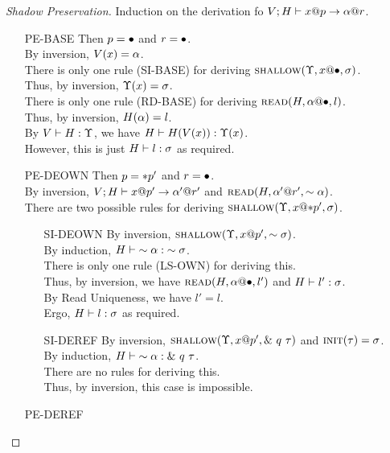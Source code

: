 \begin{proof}[Shadow Preservation]
  Induction on the derivation fo ${V;H} \vdash {{x}@{p}} \to {{\alpha}@{r}}$.
  \begin{itemize}
    \item[\textsc{PE-BASE}] 
      Then $p = \bullet$ and $r = \bullet$.\\
      By inversion, $V(x)=\alpha$.\\
      There is only one rule (\textsc{SI-BASE}) for deriving $\textsc{shallow}({\Upsilon},{{x}@{\bullet}},{\sigma})$.\\
      Thus, by inversion, $\Upsilon(x)=\sigma$.\\
      There is only one rule (\textsc{RD-BASE}) for deriving $\textsc{read}({H},{{\alpha}@{\bullet}},{l})$.\\
      Thus, by inversion, $H(\alpha)=l$.\\
      By ${V} \vdash {H} : {\Upsilon}$, we have ${H} \vdash {H(V(x))} : {\Upsilon(x)}$. \\
      However, this is just ${H} \vdash {l} : {\sigma}$ as required.
    \item[\textsc{PE-DEOWN}] 
      Then $p = *{p'}$ and $r = \bullet$.\\
      By inversion, ${V;H} \vdash {{x}@{p'}} \to {{\alpha'}@{r'}}$ 
      and $\textsc{read}({H},{{\alpha'}@{r'}},{\sim{\alpha}})$. \\
      There are two possible rules for deriving $\textsc{shallow}({\Upsilon},{{x}@{*{p'}}},{\sigma})$.
      \begin{itemize}
	\item[\textsc{SI-DEOWN}]
	  By inversion, $\textsc{shallow}({\Upsilon},{{x}@{p'}},{\sim{\sigma}})$.\\
	  By induction, ${H} \vdash {\sim{\alpha}} : {\sim{\sigma}}$.\\
	  There is only one rule (\textsc{LS-OWN}) for deriving this.\\
	  Thus, by inversion, we have $\textsc{read}({H},{{\alpha}@{\bullet}},{l'})$ and ${H} \vdash {l'} : {\sigma}$.\\
	  By Read Uniqueness, we have $l' = l$.\\
	  Ergo, ${H} \vdash {l} : {\sigma}$ as required.
	\item[\textsc{SI-DEREF}]
	  By inversion, $\textsc{shallow}({\Upsilon},{{x}@{p'}},{\&~{{q}~{\tau}}})$ 
	  and $\textsc{init}({\tau})=\sigma$.\\
	  By induction, ${H} \vdash {\sim{\alpha}} : {\&~{{q}~{\tau}}}$.\\
	  There are no rules for deriving this.\\
	  Thus, by inversion, this case is impossible.
      \end{itemize}
    \item[\textsc{PE-DEREF}] 

\end{itemize}
\end{proof}
